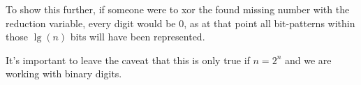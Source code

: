 To show this further, if someone were to xor the found missing number with the reduction variable, every digit would be 0, as at that point all bit-patterns within those $\lg(n)$ bits will have been represented.

It's important to leave the caveat that this is only true if $n=2^{n}$ and we are working with binary digits.
